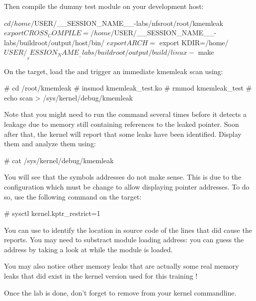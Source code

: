 Then compile the dummy test module on your development host:

\begin{bashinput}
$ cd /home/$USER/__SESSION_NAME__-labs/nfsroot/root/kmemleak
$ export CROSS_COMPILE=/home/$USER/__SESSION_NAME__-labs/buildroot/output/host/bin/%
$ export ARCH=%
$ export KDIR=/home/$USER/__SESSION_NAME__-labs/buildroot/output/build/linux-%
$ make
\end{bashinput}

On the target, load the  and trigger an immediate
kmemleak scan using:

\begin{bashinput}
# cd /root/kmemleak
# insmod kmemleak_test.ko
# rmmod kmemleak_test
# echo scan > /sys/kernel/debug/kmemleak
\end{bashinput}

Note that you might need to run the  command several times
before it detects a leakage due to memory still containing references to
the leaked pointer. Soon after that, the kernel will report that some leaks
have been identified. Display them and analyze them using:

\begin{bashinput}
# cat /sys/kernel/debug/kmemleak
\end{bashinput}

You will see that the symbols addresses do not make sense. This is due to the
 configuration which must be change to allow displaying
pointer addresses. To do so, use the following command on the target:

\begin{bashinput}
# sysctl kernel.kptr_restrict=1
\end{bashinput}

You can use  to identify the location in source code of the
lines that did cause the reports. You may need to substract module loading address:
you can guess the address by taking a look at  while the module
is loaded.

You may also notice other memory leaks that are actually some real memory leaks
that did exist in the kernel version used for this training !

Once the lab is done, don't forget to remove  from your
kernel commandline.

